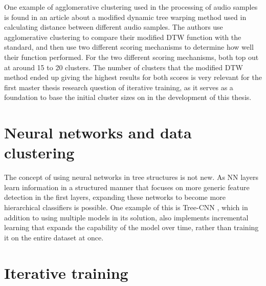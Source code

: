 One example of agglomerative clustering used in the processing of audio samples is found in an article about a modified dynamic tree warping method used in calculating distance between different audio samples\cite{ClusterExample}. The authors use agglomerative clustering to compare their modified DTW function with the standard, and then use two different scoring mechanisms to determine how well their function performed. For the two different scoring mechanisms, both top out at around 15 to 20 clusters. The number of clusters that the modified DTW method ended up giving the highest results for both scores is very relevant for the first master thesis research question of iterative training, as it serves as a foundation to base the initial cluster sizes on in the development of this thesis.


\section{Neural networks and data clustering}
The concept of using neural networks in tree structures is not new. As NN layers learn information in a structured manner that focuses on more generic feature detection in the first layers, expanding these networks to become more hierarchical classifiers is possible. One example of this is Tree-CNN \cite{roy2018treecnn}, which in addition to using multiple models in its solution, also implements incremental learning that expands the capability of the model over time, rather than training it on the entire dataset at once.

\section{Iterative training}


